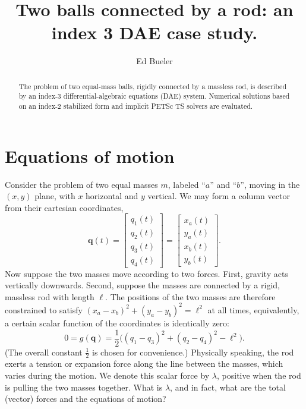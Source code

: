 \documentclass[letterpaper,final,12pt,reqno]{amsart}
\newcommand{\bq}{\mathbf{q}}
\begin{document}
\title[Two balls connected by a rod]{Two balls connected by a rod: an index 3 DAE case study.}

\author{Ed Bueler}

\begin{abstract}
The problem of two equal-mass balls, rigidly connected by a massless rod, is described by an index-3 differential-algebraic equations (DAE) system.  Numerical solutions based on an index-2 stabilized form and implicit PETSc TS solvers are evaluated.
\end{abstract}

\maketitle


\thispagestyle{empty}
\bigskip

\section{Equations of motion}

Consider the problem of two equal masses $m$, labeled ``$a$'' and ``$b$'', moving in the $(x,y)$ plane, with $x$ horizontal and $y$ vertical.  We may form a column vector from their cartesian coordinates,
\begin{equation}
\bq(t) = \begin{bmatrix} q_1(t) \\ q_2(t) \\ q_3(t) \\ q_4(t) \end{bmatrix} = \begin{bmatrix} x_a(t) \\ y_a(t) \\ x_b(t) \\ y_b(t) \end{bmatrix}. \label{position}
\end{equation}
Now suppose the two masses move according to two forces.  First, gravity acts vertically downwards.  Second, suppose the masses are connected by a rigid, massless rod with length $\ell$.  The positions of the two masses are therefore constrained to satisfy $(x_a - x_b)^2 + (y_a - y_b)^2 = \ell^2$ at all times, equivalently, a certain scalar function of the coordinates is identically zero:
\begin{equation}
0 = g(\bq) = \frac{1}{2} \Big((q_1 - q_3)^2 + (q_2 - q_4)^2 - \ell^2\Big). \label{constraint}
\end{equation}
(The overall constant $\frac{1}{2}$ is chosen for convenience.)  Physically speaking, the rod exerts a tension or expansion force along the line between the masses, which varies during the motion.  We denote this scalar force by $\lambda$, positive when the rod is pulling the two masses together.  What is $\lambda$, and in fact, what are the total (vector) forces and the equations of motion?
\end{document}
